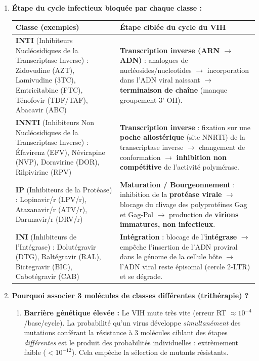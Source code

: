 \documentclass[11pt]{article}
\begin{document}
\begin{corrige}
\begin{enumerate}
\item \textbf{Étape du cycle infectieux bloquée par chaque classe :}
\begin{center}
\begin{tabularx}{\linewidth}{|l|X|}\hline
\rowcolor{popblueL} \textbf{Classe (exemples)} & \textbf{Étape ciblée du cycle du VIH} \\ \hline
\textbf{INTI} (Inhibiteurs Nucléosidiques de la Transcriptase Inverse) : Zidovudine (AZT), Lamivudine (3TC), Emtricitabine (FTC), Ténofovir (TDF/TAF), Abacavir (ABC) & \textbf{Transcription inverse (ARN $\to$ ADN)} : analogues de nucléosides/nucleotides $\to$ incorporation dans l'ADN viral naissant $\to$ \textbf{terminaison de chaîne} (manque groupement 3'-OH). \\ \hline
\textbf{INNTI} (Inhibiteurs Non Nucléosidiques de la Transcriptase Inverse) : Éfavirenz (EFV), Névirapine (NVP), Doravirine (DOR), Rilpivirine (RPV) & \textbf{Transcription inverse} : fixation sur une \textbf{poche allostérique} (site NNRTI) de la transcriptase inverse $\to$ changement de conformation $\to$ \textbf{inhibition non compétitive} de l'activité polymérase. \\ \hline
\textbf{IP} (Inhibiteurs de la Protéase) : Lopinavir/r (LPV/r), Atazanavir/r (ATV/r), Darunavir/r (DRV/r) & \textbf{Maturation / Bourgeonnement} : inhibition de la \textbf{protéase virale} $\to$ blocage du clivage des polyprotéines Gag et Gag-Pol $\to$ production de \textbf{virions immatures, non infectieux}. \\ \hline
\textbf{INI} (Inhibiteurs de l'Intégrase) : Dolutégravir (DTG), Raltégravir (RAL), Bictegravir (BIC), Cabotégravir (CAB) & \textbf{Intégration} : blocage de l'\textbf{intégrase} $\to$ empêche l'insertion de l'ADN proviral dans le génome de la cellule hôte $\to$ l'ADN viral reste épisomal (cercle 2-LTR) et se dégrade. \\ \hline
\end{tabularx}
\end{center}
\item \textbf{Pourquoi associer 3 molécules de classes différentes (trithérapie) ?}
\begin{enumerate}
\item \textbf{Barrière génétique élevée :} Le VIH mute très vite (erreur RT $\approx 10^{-4}$/base/cycle). La probabilité qu'un virus développe \emph{simultanément} des mutations conférant la résistance à 3 molécules ciblant des étapes \emph{différentes} est le produit des probabilités individuelles : extrèmement faible ($< 10^{-12}$). Cela empêche la sélection de mutants résistants.

\end{enumerate}
\end{enumerate}
\end{corrige}
\end{document}
